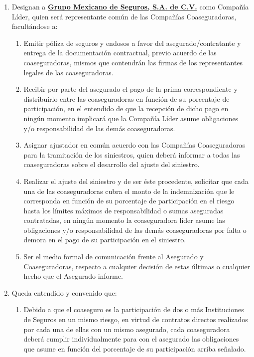 \documentclass[letterpaper,10pt]{article}
\begin{document}
\renewcommand{\labelenumii}{\roman{enumii}}
\begin{enumerate}
    \item Designan a \textbf{\underline{Grupo Mexicano de Seguros, S.A. de C.V.}} como Compañía Líder, quien será representante común de las Compañías Coaseguradoras, facultándose a:
        \begin{enumerate}
            \item Emitir póliza de seguros y endosos a favor del asegurado/contratante y entrega de la documentación contractual, previo acuerdo de las coaseguradoras, mismos que contendrán las firmas de los representantes legales de las coaseguradoras.
            \item Recibir por parte del asegurado el pago de la prima correspondiente y distribuirlo entre las coaseguradoras en función de su porcentaje de participación, en el entendido de que la recepción de dicho pago en ningún momento implicará que la Compañía Líder asume obligaciones y/o responsabilidad de las demás coaseguradoras.
            \item Asignar ajustador en común acuerdo con las Compañías Coaseguradoras para la tramitación de los siniestros, quien deberá informar a todas las coaseguradoras sobre el desarrollo del ajuste del siniestro.
            \item Realizar el ajuste del siniestro y de ser éste procedente, solicitar que cada una de las coaseguradoras cubra el monto de la indemnización que le corresponda en función de su porcentaje de participación en el riesgo hasta los límites máximos de responsabilidad o sumas aseguradas contratadas, en ningún momento la coaseguradora líder asume las obligaciones y/o responsabilidad de las demás coaseguradoras por falta o demora en el pago de su participación en el siniestro.
            \item Ser el medio formal de comunicación frente al Asegurado y Coaseguradoras, respecto a cualquier decisión de estas últimas o cualquier hecho que el Asegurado informe.
        \end{enumerate}
    \item Queda entendido y convenido que:
        \renewcommand{\labelenumii}{\alph{enumii}}
        \begin{enumerate}
            \item Debido a que el coaseguro es la participación de dos o más Instituciones de Seguros en un mismo riesgo, en virtud de contratos directos realizados por cada una de ellas con un mismo asegurado, cada coaseguradora deberá cumplir individualmente para con el asegurado las obligaciones que asume en función del porcentaje de su participación arriba señalado.

\end{enumerate}
\end{enumerate}
\end{document}
